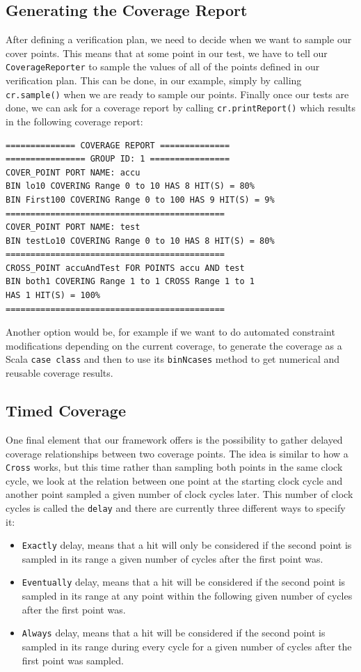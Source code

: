 \documentclass[runningheads]{llncs}
\begin{document}
\subsection{Generating the Coverage Report}
After defining a verification plan, we need to decide when we want to sample our cover points. This means that at some point in our test, we have to tell our \texttt{CoverageReporter} to sample the values of all of the points defined in our verification plan. This can be done, in our example, simply by calling \texttt{cr.sample()} when we are ready to sample our points. Finally once our tests are done, we can ask for a coverage report by calling \texttt{cr.printReport()} which results in the following coverage report: 
\begin{verbatim}
============== COVERAGE REPORT ==============
================ GROUP ID: 1 ================
COVER_POINT PORT NAME: accu
BIN lo10 COVERING Range 0 to 10 HAS 8 HIT(S) = 80%
BIN First100 COVERING Range 0 to 100 HAS 9 HIT(S) = 9%
============================================
COVER_POINT PORT NAME: test
BIN testLo10 COVERING Range 0 to 10 HAS 8 HIT(S) = 80%
============================================
CROSS_POINT accuAndTest FOR POINTS accu AND test
BIN both1 COVERING Range 1 to 1 CROSS Range 1 to 1 
HAS 1 HIT(S) = 100%
============================================
\end{verbatim}
Another option would be, for example if we want to do automated constraint modifications depending on the current coverage, to generate the coverage as a Scala \texttt{case class} and then to use its \texttt{binNcases} method to get numerical and reusable coverage results.  
  
\subsection{Timed Coverage}
One final element that our framework offers is the possibility to gather delayed coverage relationships between two coverage points. The idea is similar to how a \texttt{Cross} works, but this time rather than sampling both points in the same clock cycle, we look at the relation between one point at the starting clock cycle and another point sampled a given number of clock cycles later. This number of clock cycles is called the \texttt{delay} and there are currently three different ways to specify it:  
\begin{itemize}
 \item \texttt{Exactly} delay, means that a hit will only be considered if the second point is sampled in its range a given number of cycles after the first point was.
 \item \texttt{Eventually} delay, means that a hit will be considered if the second point is sampled in its range at any point within the following given number of cycles after the first point was.  
 \item \texttt{Always} delay, means that a hit will be considered if the second point is sampled in its range during every cycle for a given number of cycles after the first point was sampled.
\end{itemize}  
\end{document}
